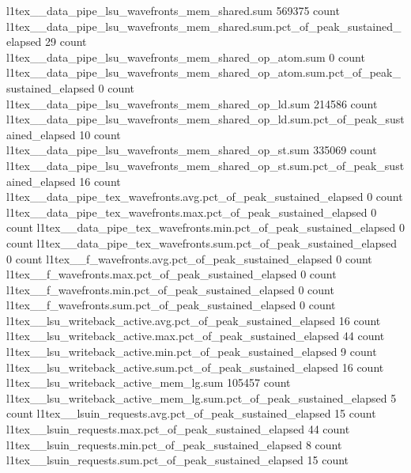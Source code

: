l1tex__data_pipe_lsu_wavefronts_mem_shared.sum                                            569375 count
l1tex__data_pipe_lsu_wavefronts_mem_shared.sum.pct_of_peak_sustained_elapsed                  29 count
l1tex__data_pipe_lsu_wavefronts_mem_shared_op_atom.sum                                         0 count
l1tex__data_pipe_lsu_wavefronts_mem_shared_op_atom.sum.pct_of_peak_sustained_elapsed               0 count
l1tex__data_pipe_lsu_wavefronts_mem_shared_op_ld.sum                                      214586 count
l1tex__data_pipe_lsu_wavefronts_mem_shared_op_ld.sum.pct_of_peak_sustained_elapsed              10 count
l1tex__data_pipe_lsu_wavefronts_mem_shared_op_st.sum                                      335069 count
l1tex__data_pipe_lsu_wavefronts_mem_shared_op_st.sum.pct_of_peak_sustained_elapsed              16 count
l1tex__data_pipe_tex_wavefronts.avg.pct_of_peak_sustained_elapsed                              0 count
l1tex__data_pipe_tex_wavefronts.max.pct_of_peak_sustained_elapsed                              0 count
l1tex__data_pipe_tex_wavefronts.min.pct_of_peak_sustained_elapsed                              0 count
l1tex__data_pipe_tex_wavefronts.sum.pct_of_peak_sustained_elapsed                              0 count
l1tex__f_wavefronts.avg.pct_of_peak_sustained_elapsed                                          0 count
l1tex__f_wavefronts.max.pct_of_peak_sustained_elapsed                                          0 count
l1tex__f_wavefronts.min.pct_of_peak_sustained_elapsed                                          0 count
l1tex__f_wavefronts.sum.pct_of_peak_sustained_elapsed                                          0 count
l1tex__lsu_writeback_active.avg.pct_of_peak_sustained_elapsed                                 16 count
l1tex__lsu_writeback_active.max.pct_of_peak_sustained_elapsed                                 44 count
l1tex__lsu_writeback_active.min.pct_of_peak_sustained_elapsed                                  9 count
l1tex__lsu_writeback_active.sum.pct_of_peak_sustained_elapsed                                 16 count
l1tex__lsu_writeback_active_mem_lg.sum                                                    105457 count
l1tex__lsu_writeback_active_mem_lg.sum.pct_of_peak_sustained_elapsed                           5 count
l1tex__lsuin_requests.avg.pct_of_peak_sustained_elapsed                                       15 count
l1tex__lsuin_requests.max.pct_of_peak_sustained_elapsed                                       44 count
l1tex__lsuin_requests.min.pct_of_peak_sustained_elapsed                                        8 count
l1tex__lsuin_requests.sum.pct_of_peak_sustained_elapsed                                       15 count
